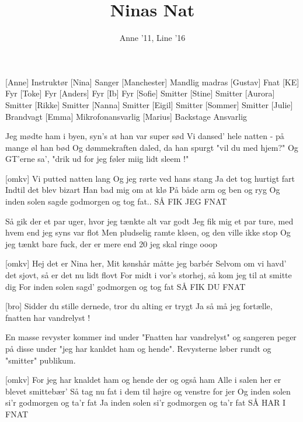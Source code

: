 \documentclass[a4paper,11pt]{article}
\title{Ninas Nat}
\author{Anne '11, Line '16}
\begin{document}
\maketitle

\begin{roles}
[Anne] Instruktør
[Nina] Sanger
[Manchester] Mandlig madras
[Gustav] Fnat
[KE] Fyr
[Toke] Fyr
[Anders] Fyr
[Ib] Fyr
[Sofie] Smitter
[Stine] Smitter
[Aurora] Smitter
[Rikke] Smitter
[Nanna] Smitter
[Eigil] Smitter
[Sommer] Smitter
[Julie] Brandvagt
[Emma] Mikrofonansvarlig
[Marius] Backstage Ansvarlig
\end{roles}

\begin{song}
   Jeg mødte ham i byen, syn's at han var super sød
  Vi dansed' hele natten - på mange øl han bød
  Og dømmekraften daled, da han spurgt "vil du med hjem?"
  Og GT'erne sa', "drik ud for jeg føler miig lidt sleem !"

  [omkv] 
  Vi putted natten lang 
  Og jeg rørte ved hans stang
  Ja det tog hurtigt fart
  Indtil det blev bizart
  Han bad mig om at klø
  På både arm og ben og ryg
  Og inden solen sagde godmorgen og tog fat..
  SÅ FIK JEG FNAT
  
  Så gik der et par uger, hvor jeg tænkte alt var godt
  Jeg fik mig et par ture, med hvem end jeg syns var flot
  Men pludselig ramte kløen, og den ville ikke stop
  Og jeg tænkt bare fuck, der er mere end 20 jeg skal ringe ooop
 
  [omkv]
  Hej det er Nina her,  
  Mit kønshår måtte jeg barbér
  Selvom om vi havd' det sjovt, 
  så er det nu lidt flovt
  For midt i vor's storhej, 
  så kom jeg til at smitte dig
  For inden solen sagd' godmorgen og tog fat
  SÅ FIK DU FNAT
  
  [bro]
  Sidder du stille dernede, tror du alting er trygt
  Ja så må jeg fortælle, fnatten har vandrelyst !

\scene En masse revyster kommer ind under "Fnatten har vandrelyst" og sangeren peger på disse under "jeg har kanldet ham og hende". Revysterne løber rundt og "smitter" publikum.

[omkv]
For jeg har knaldet ham og hende der og også ham
Alle i salen her er blevet smittebær’
Så tag nu fat i dem til højre og venstre for jer
Og inden solen si’r godmorgen og ta’r fat
Ja inden solen si’r godmorgen og ta’r fat
SÅ HAR I FNAT


\end{song}
\end{document}
